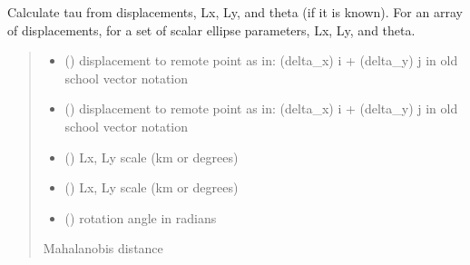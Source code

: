 \documentclass[letterpaper,10pt,english]{sphinxmanual}
\begin{document}
\begin{fulllineitems}
\label{\detokenize{misc:glomar_gridding.distances.mahal_dist_func}}
\pysigstartsignatures
\pysiglinewithargsret
{}
{\sphinxparamcomma {}\sphinxparamcomma {}\sphinxparamcomma {}\sphinxparamcomma {}}
{}
\pysigstopsignatures
\sphinxAtStartPar
Calculate tau from displacements, Lx, Ly, and theta (if it is known). For
an array of displacements, for a set of scalar ellipse parameters, Lx, Ly,
and theta.
\begin{quote}\begin{description}
\begin{itemize}
\item {}
\sphinxAtStartPar
{} () \textendash{} displacement to remote point as in: (delta\_x) i + (delta\_y) j in old
school vector notation

\item {}
\sphinxAtStartPar
{} () \textendash{} displacement to remote point as in: (delta\_x) i + (delta\_y) j in old
school vector notation

\item {}
\sphinxAtStartPar
{} () \textendash{} Lx, Ly scale (km or degrees)

\item {}
\sphinxAtStartPar
{} () \textendash{} Lx, Ly scale (km or degrees)

\item {}
\sphinxAtStartPar
{} () \textendash{} rotation angle in radians

\end{itemize}

\sphinxAtStartPar
{} \textendash{} Mahalanobis distance

\sphinxAtStartPar
{}

\end{description}\end{quote}

\end{fulllineitems}
\end{document}
